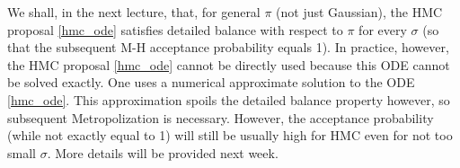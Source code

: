 \documentclass{scrartcl}
\begin{document}
We shall, in the next lecture, that, for general $\pi$ (not just
Gaussian), the HMC proposal \eqref{hmc_ode} satisfies detailed balance
with respect to $\pi$ for every $\sigma$ (so that the subsequent
M-H acceptance probability equals 1). In practice, however, the
HMC proposal \eqref{hmc_ode} cannot be directly used because this ODE
cannot be solved exactly. One uses a numerical approximate solution to
the ODE \eqref{hmc_ode}. This approximation spoils the detailed
balance property however, so subsequent Metropolization is
necessary. However, the acceptance probability (while not exactly
equal to 1) will still be usually high for HMC even for not too small
$\sigma$. More details will be provided next week. 












  



  
\end{document}
